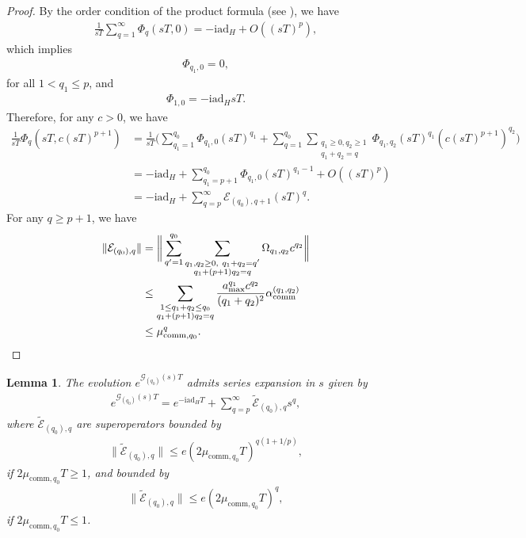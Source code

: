 \documentclass[aps,pra,reprint,groupedaddress,floatfix]{revtex4-2}
\newtheorem{lemma}{Lemma}
\renewcommand{\i}{\mathrm{i}}
\renewcommand{\L}{\mathcal{L}}
\newcommand{\ad}{\mathrm{ad}}
\newcommand{\G}{\mathcal{G}}
\newcommand{\E}{\mathcal{E}}
\begin{document}
\begin{proof}
    By the order condition of the product formula (see \citep[Lemma 2]{watson2025exponentially}), we have \begin{align*}
        \frac{1}{sT}\sum_{q=1}^{\infty} \Phi_{q}(sT,0) = -\i \ad_H + O((sT)^p),
    \end{align*}
    which implies \begin{align*}
        \Phi_{q_1, 0} = 0,
    \end{align*}
    for all $1 <q_1 \le p$, and \begin{align*}
        \Phi_{1,0} = - \i \ad_H sT.
    \end{align*} 
    Therefore, for any $c>0$, we have \begin{align*}
        \frac{1}{sT} \Phi_{q}(sT,c(sT)^{p+1})&= \frac{1}{sT}\Big(\sum_{q_1=1}^{q_0}\Phi_{q_1, 0}(sT)^{q_1} + \sum_{q = 1}^{q_0}\sum_{\substack{q_1\ge 0,q_2\ge 1\\ q_1+q_2 = q}} \Phi_{q_1, q_2} (sT)^{q_1}(c(sT)^{p+1})^{q_2}\Big) \\
        & = -\i \ad_H + \sum_{q_1 = p+1}^{q_0} \Phi_{q_1, 0} (sT)^{q_1-1} + O((sT)^{p}) \\
        & = -\i \ad_H + \sum_{q = p}^{\infty} \E_{(q_0),q+1} (sT)^{q}.
    \end{align*}
    For any $q\ge p+1$, we have \begin{align*}
        \|\E_{(q_0),q}\| &= \bigg\|\sum_{q'=1}^{q_0}\sum_{\substack{q_1, q_2\ge 0,~ q_1+q_2=q' \\
        q_1+(p+1)q_2 = q}} \Omega_{q_1,q_2} c^{q_2} \bigg\|\\
        &\le \sum_{\substack{1\le q_1+ q_2\le q_0 \\
        q_1+(p+1)q_2 = q}}\frac{a_{\max}^{q_1}c^{q_2}}{(q_1+q_2)^2} \alpha_{\rm comm}^{(q_1, q_2)} \\
        &\le  \mu_{\mathrm{comm},q_0}^q.
    \end{align*}
\end{proof}
\begin{lemma}
\label{lem:expansion-exp-G(s)}
    The evolution $e^{\G_{(q_0)}(s) T}$ admits series expansion in $s$ given by \begin{align*}
        e^{\G_{(q_0)}(s) T}=e^{-\i \ad_H T}+ \sum_{q=p}^{\infty}\tilde{\E}_{(q_0),q} s^q,
    \end{align*}
    where $\tilde{\E}_{(q_0),q}$ are superoperators bounded by \begin{align*}
       \|\tilde{\E}_{(q_0),q}\|\le   e(2\mu_{\mathrm{comm},q_0}T)^{q(1+1/p)},
    \end{align*}
    if $2\mu_{\mathrm{comm},q_0}T\ge 1$, and bounded by \begin{align*}
        \|\tilde{\E}_{(q_0),q}\|\le e(2\mu_{\mathrm{comm},q_0}T)^{q},
    \end{align*}
    if $2\mu_{\mathrm{comm},q_0}T\le 1$.
\end{lemma}
\end{document}
